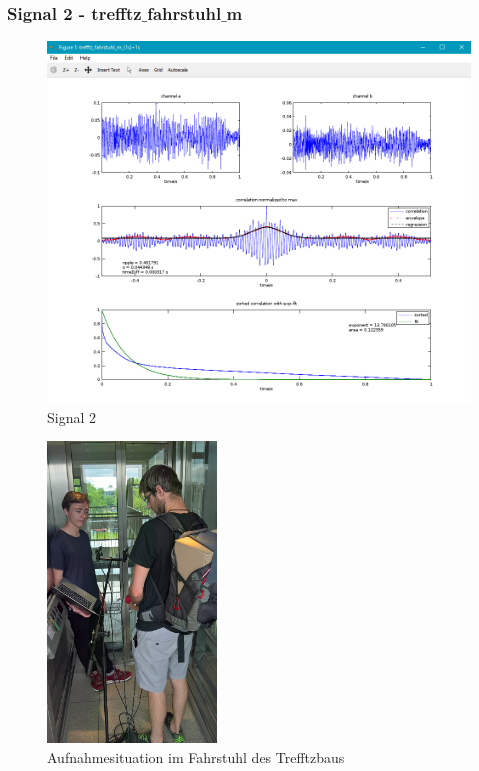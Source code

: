 \subsubsection{Signal 2 - trefftz$\_$fahrstuhl$\_$m}
\begin{figure}[ht!]
  \centering
  \includegraphics[scale=0.6]{img/trefftz_fahrstuhl_m}
  \caption{Signal 2}
  \label{figure3}
\end{figure}
\begin{figure}[ht!]
  \centering
  \includegraphics[width=0.4\textwidth]{img/fahrstuhl}
  \caption{Aufnahmesituation im Fahrstuhl des Trefftzbaus}
  \label{figure5}
\end{figure}

